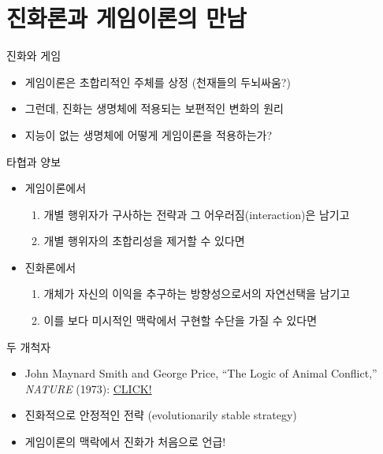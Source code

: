 \documentclass[final]{beamer}
\begin{document}
\section{진화론과 게임이론의 만남} %
\label{sec:evoGame}

\begin{frame}[t]{진화와 게임}
	\begin{itemize}
		\item 게임이론은 초합리적인 주체를 상정 (천재들의 두뇌싸움?)
		\item 그런데, 진화는 생명체에 적용되는 보편적인 변화의 원리
		\item 지능이 없는 생명체에 어떻게 게임이론을 적용하는가? 
	\end{itemize}
\end{frame}

\begin{frame}[t]{타협과 양보}
	\begin{itemize}
	\item 게임이론에서 \\[1em]
		\begin{enumerate}
			\item 개별 행위자가 구사하는 전략과 그 어우러짐(interaction)은 남기고  
			\item 개별 행위자의 초합리성을 제거할 수 있다면 
		\end{enumerate}
	\item 진화론에서 \\[1em]
		\begin{enumerate}
			\item 개체가 자신의 이익을 추구하는 방향성으로서의 자연선택을 남기고 
			\item 이를 보다 미시적인 맥락에서 구현할 수단을 가질 수 있다면
		\end{enumerate}
	\end{itemize}
\end{frame}

\begin{frame}[t]{두 개척자}
	\begin{itemize}
		\item John Maynard Smith and George Price, ``The Logic of Animal Conflict,'' {\itshape NATURE} (1973): \href{http://www.webpages.uidaho.edu/~lukeh/giants/maynardSmith1973.pdf}{CLICK!}
		\item 진화적으로 안정적인 전략 (evolutionarily stable strategy)
		\item 게임이론의 맥락에서 진화가 처음으로 언급! 
	\end{itemize}
\end{frame}
\end{document}
